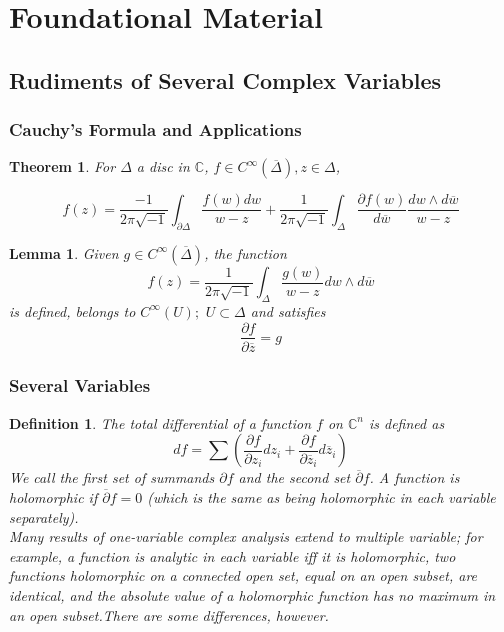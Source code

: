 \documentclass{article}
\newtheorem{thm}{Theorem}
\newtheorem{defn}{Definition}
\newtheorem{lem}{Lemma}
\begin{document}
   


\section{Foundational Material}
\subsection{Rudiments of Several Complex Variables}
\subsubsection{Cauchy's Formula and Applications}


\begin{thm}

	For $\Delta$ a disc in $ \mathbb{C}$, $f \in C^{\infty}( \overline{\Delta} ), z \in \Delta$,

\[
	f(z) = \frac{-1}{2 \pi \sqrt{-1}} \int_{\partial \Delta} \frac{f(w)dw}{w-z}+ \frac{1}{2 \pi \sqrt{-1}} \int_{\Delta} \frac{\partial f(w)}{d \overline{w}} \frac{dw \wedge d \overline{w}}{w-z}
\]

\end{thm}



\begin{lem}

	Given $g \in C^{\infty}( \overline{\Delta} ) $, the function
\[
	f(z) = \frac{1}{2 \pi \sqrt{-1}} \int_{\Delta} \frac{g(w)}{w-z} dw \wedge d \overline{w}
\]
is defined, belongs to $ C^{\infty}( U ) ; \hspace{4pt} U \subset \Delta$ and satisfies
\[
	\frac{\partial f}{\partial \overline{z}}= g
\]
\end{lem}

\subsubsection{Several Variables}


\begin{defn}

The total differential of a function $f$ on $ \mathbb{C}^n$ is defined as
\[
	df = \sum \left( \frac{ \partial f }{\partial z_i } dz_i + \frac{ \partial f }{\partial \overline{z}_i } d\overline{z}_i \right)  
\]
We call the first set of summands $ \partial f$ and the second set $\overline{\partial} f$. A function is holomorphic if $ \overline{\partial} f = 0$ (which is the same as being holomorphic in each variable separately).\\
\indent Many results of one-variable complex analysis extend to multiple variable; for example, a function is analytic in each variable iff it is holomorphic, two functions holomorphic on a connected open set, equal on an open subset, are identical, and the absolute value of a holomorphic function has no maximum in an open subset.There are some differences, however.

\end{defn}
\end{document}
